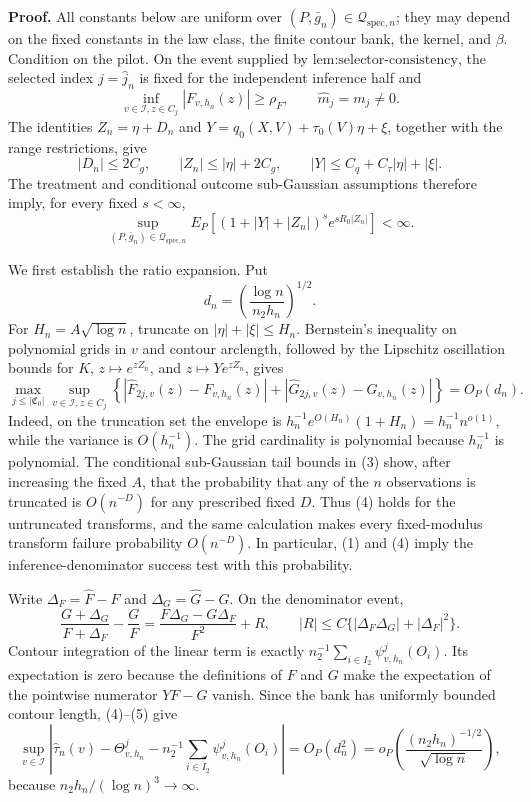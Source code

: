 \textbf{Proof.}
All constants below are uniform over \((P,\bar g_n)\in\mathcal Q_{\mathrm{spec},n}\); they may depend on the fixed constants in the law class, the finite contour bank, the kernel, and \(\beta\).  Condition on the pilot.  On the event supplied by \(\text{lem:selector-consistency}\), the selected index \(j=\widehat j_n\) is fixed for the independent inference half and
\[
 \inf_{v\in\mathcal I,z\in C_j}|F_{v,h_n}(z)|\ge\rho_F,
 \qquad \widehat m_j=m_j\ne0. \tag{1}
\]
The identities \(Z_n=\eta+D_n\) and \(Y=q_0(X,V)+\tau_0(V)\eta+\xi\), together with the range restrictions, give
\[
 |D_n|\le2C_g,
 \qquad |Z_n|\le|\eta|+2C_g,
 \qquad |Y|\le C_q+C_\tau|\eta|+|\xi|. \tag{2}
\]
The treatment and conditional outcome sub-Gaussian assumptions therefore imply, for every fixed \(s<\infty\),
\[
 \sup_{(P,\bar g_n)\in\mathcal Q_{\mathrm{spec},n}}
 E_P\!\left[(1+|Y|+|Z_n|)^s e^{sR_0|Z_n|}\right]<\infty. \tag{3}
\]

We first establish the ratio expansion.  Put
\[
 d_n=\left(\frac{\log n}{n_2h_n}\right)^{1/2}.
\]
For \(H_n=A\sqrt{\log n}\), truncate on \(|\eta|+|\xi|\le H_n\).  Bernstein's inequality on polynomial grids in \(v\) and contour arclength, followed by the Lipschitz oscillation bounds for \(K\), \(z\mapsto e^{zZ_n}\), and \(z\mapsto Ye^{zZ_n}\), gives
\[
 \max_{j\le|\mathfrak C_0|}\sup_{v\in\mathcal I,z\in C_j}
 \left\{|\widehat F_{2j,v}(z)-F_{v,h_n}(z)|
 +|\widehat G_{2j,v}(z)-G_{v,h_n}(z)|\right\}=O_P(d_n). \tag{4}
\]
Indeed, on the truncation set the envelope is
\(h_n^{-1}e^{O(H_n)}(1+H_n)=h_n^{-1}n^{o(1)}\), while the variance is \(O(h_n^{-1})\).  The grid cardinality is polynomial because \(h_n^{-1}\) is polynomial.  The conditional sub-Gaussian tail bounds in (3) show, after increasing the fixed \(A\), that the probability that any of the \(n\) observations is truncated is \(O(n^{-D})\) for any prescribed fixed \(D\).  Thus (4) holds for the untruncated transforms, and the same calculation makes every fixed-modulus transform failure probability \(O(n^{-D})\).  In particular, (1) and (4) imply the inference-denominator success test with this probability.

Write \(\Delta_F=\widehat F-F\) and \(\Delta_G=\widehat G-G\).  On the denominator event,
\[
 \frac{G+\Delta_G}{F+\Delta_F}-\frac GF
 =\frac{F\Delta_G-G\Delta_F}{F^2}+R,
 \qquad |R|\le C\{|\Delta_F\Delta_G|+|\Delta_F|^2\}. \tag{5}
\]
Contour integration of the linear term is exactly
\(n_2^{-1}\sum_{i\in I_2}\psi^j_{v,h_n}(O_i)\).  Its expectation is zero because the definitions of \(F\) and \(G\) make the expectation of the pointwise numerator \(YF-G\) vanish.  Since the bank has uniformly bounded contour length, (4)--(5) give
\[
 \sup_{v\in\mathcal I}\left|
 \widehat\tau_n(v)-\Theta^j_{v,h_n}
 -n_2^{-1}\sum_{i\in I_2}\psi^j_{v,h_n}(O_i)
 \right|
 =O_P(d_n^2)
 =o_P\!\left(\frac{(n_2h_n)^{-1/2}}{\sqrt{\log n}}\right), \tag{6}
\]
because \(n_2h_n/(\log n)^3\to\infty\).

